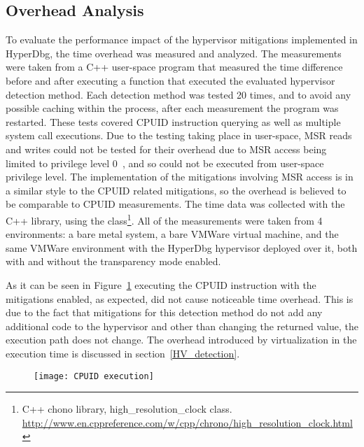 \subsection{Overhead Analysis}
To evaluate the performance impact of the hypervisor mitigations implemented in HyperDbg, the time overhead was measured and analyzed. 
The measurements were taken from a C++ user-space program that measured the time difference before and after executing a function that executed the evaluated hypervisor detection method. 
Each detection method was tested 20 times, and to avoid any possible caching within the process, after each measurement the program was restarted. 
These tests covered CPUID instruction querying as well as multiple system call executions. Due to the testing taking place in user-space, 
MSR reads and writes could not be tested for their overhead due to MSR access being limited to privilege level 0~\cite[Volume 2B]{Intel-SDM2025}, and so could not be executed from user-space privilege level.
The implementation of the mitigations involving MSR access is in a similar style to the CPUID related mitigations, so the overhead is believed to be comparable to CPUID measurements.
The time data was collected with the C++  library, 
using the  class\footnote{C++ chono library, high\_resolution\_clock class. \url{http://www.en.cppreference.com/w/cpp/chrono/high_resolution_clock.html}}.
All of the measurements were taken from 4 environments: a bare metal system, a bare VMWare virtual machine, and the same 
VMWare environment with the HyperDbg hypervisor deployed over it, both with and without the transparency mode enabled.

As it can be seen in Figure~\ref{fig:cpuid_exec_time} executing the CPUID instruction with the mitigations enabled, as expected, did not cause noticeable time overhead. 
This is due to the fact that mitigations for this detection method do not add any additional code to the hypervisor and other than changing the returned value, the execution path does not change.
The overhead introduced by virtualization in the execution time is discussed in section~\ref{HV_detection}.
\begin{figure}[tbh]
    \texttt{[image: CPUID execution]} %
    \label{fig:cpuid_exec_time}
\end{figure}

